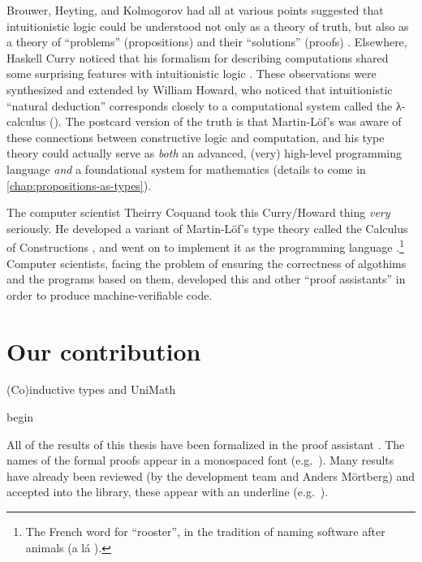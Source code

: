 \documentclass[./thesis.tex]{subfiles}
\begin{document}
Brouwer, Heyting, and Kolmogorov had all at various points suggested that
intuitionistic logic could be understood not only as a theory of truth, but also
as a theory of ``problems'' (propositions) and their ``solutions'' (proofs)
\cite{kolmogorov}. Elsewhere, Haskell Curry noticed that his formalism for
describing computations shared some surprising features with intuitionistic
logic \cite{curry-howard}. These observations were synthesized and extended by
William Howard, who noticed that intuitionistic ``natural deduction''
corresponds closely to a computational system called the λ-calculus (\LC{}).
The postcard version of the truth is that Martin-Löf's was aware of these
connections between constructive logic and computation, and his type theory
could actually serve as \textit{both} an advanced, (very) high-level programming
language \textit{and} a foundational system for mathematics (details to come in
\cref{chap:propositions-as-types}).

The computer scientist Theirry Coquand took this Curry/Howard thing
\textit{very} seriously. He developed a variant of Martin-Löf's type theory
called the Calculus of Constructions \cite{coquand}, and went on to implement it
as the programming language \Coq{}.\footnote{The French word for ``rooster'', in
  the tradition of naming software after animals (a lá ).}
Computer scientists, facing the problem of ensuring the correctness of algothims
and the programs based on them, developed this and other ``proof assistants''
in order to produce machine-verifiable code.

\section*{Our contribution}

(Co)inductive types and UniMath

begin
\begin{notation}
  All of the results of this thesis have been formalized in the \Coq{} proof
  assistant \cite{coq-manual}. The names of the formal proofs
  appear in a monospaced font (e.g.\ ). Many results have
  already been reviewed (by the \UniMath{} development team \cite{unimath} and
  Anders Mörtberg) and accepted into the \UniMath{} library, these appear
  with an underline (e.g.\ ).
\end{notation}
\end{document}
